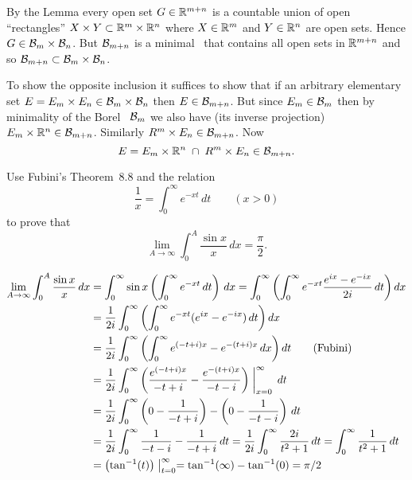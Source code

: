 \begin{enumerate}
By the Lemma every open set \(G\in \mathbb{R}^{m+n}\) is a countable union
of open ``rectangles'' \(X\times Y\subset \mathbb{R}^m\times\mathbb{R}^n\) 
where \(X\in\mathbb{R}^m\) and \(Y\in\mathbb{R}^n\) are open sets.
Hence \(G\in \mathcal{B}_m \times \mathcal{B}_n\).
But \(\mathcal{B}_{m+n}\) is a minimal \salgebra\ that contains all open sets
in \(\mathbb{R}^{m+n}\) and so \(\mathcal{B}_{m+n} \subset \mathcal{B}_m \times \mathcal{B}_n\).

To show the opposite inclusion it suffices to show that if
an arbitrary elementary set
\(E = E_m\times E_n \in \mathcal{B}_m \times \mathcal{B}_n\)
then \(E\in \mathcal{B}_{m+n}\).
But since \(E_m\in \mathcal{B}_m\) then by minimality of the 
Borel \salgebra\ \(\mathcal{B}_m\) we also have (its inverse projection)
\(E_m\times\mathbb{R}^n\in\mathcal{B}_{m+n}\).
Similarly \(R^m\times E_n\in\mathcal{B}_{m+n}\). Now
\begin{equation*}
E = E_m\times\mathbb{R}^n \;\cap\;R^m\times E_n \in \mathcal{B}_{m+n}.
\end{equation*}


\begin{excopy}
Use Fubini's
Theorem~8.8 and the relation
\begin{equation*}
\frac{1}{x} = \int_0^\infty e^{-xt}\,dt \qquad (x>0)
\end{equation*}
to prove that 
\begin{equation*}
\lim_{A\to\infty} \int_0^A \frac{\sin x}{x}\,dx = \frac{\pi}{2}.
\end{equation*}
\end{excopy}

\begin{align*}
\lim_{A\to\infty}\int_0^A \frac{\sin x}{x}\,dx 
&= \int_0^\infty \sin x\left( \int_0^\infty e^{-xt}\,dt\right)\,dx 
 = \int_0^\infty \left(\int_0^\infty e^{-xt}\frac{e^{ix}-e^{-ix}}{2i}\,dt\right)dx \\
&= \frac{1}{2i}\int_0^\infty \left(\int_0^\infty e^{-xt}(e^{ix}-e^{-ix})\,dt\right)dx
   \\
&= \frac{1}{2i}\int_0^\infty 
        \left(\int_0^\infty e^{(-t+i)x}-e^{-(t+i)x}\,dx\right)dt 
   \qquad \textnormal{(Fubini)}
   \\
&= \frac{1}{2i}\int_0^\infty \left(
       \frac{e^{(-t+i)x}}{-t+i} - \frac{e^{-(t+i)x}}{-t-i}
    \right)\biggm|_{x=0}^\infty \,dt \\
&= \frac{1}{2i}\int_0^\infty 
        \left(0 - \frac{1}{-t + i}\right)
        - \left(0 - \frac{1}{-t - i}\right)\,dt \\
&= \frac{1}{2i}\int_0^\infty 
        \frac{1}{-t - i} - \frac{1}{-t + i}\,dt
 = \frac{1}{2i}\int_0^\infty \frac{2i}{t^2 + 1}\,dt
 = \int_0^\infty \frac{1}{t^2 + 1}\,dt \\
&= \left(\tan^{-1}(t)\right)\bigm|_{t=0}^\infty
 = \tan^{-1}(\infty) - \tan^{-1}(0) = \pi/2
\end{align*}



\end{enumerate}
